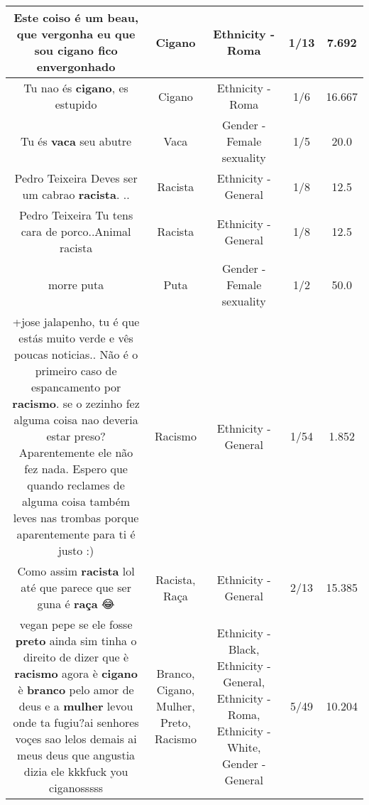 \documentclass[11pt]{article}
\newlength\mylength
\begin{document}
\begin{center}
\begin{longtable}{|C{.65\mylength}|C{.30\mylength}|C{.12\mylength}|C{.12\mylength}|C{.12\mylength}|}
  \small Este coiso é um beau, que vergonha eu que sou \textbf{cigano} fico envergonhado\normalsize   & Cigano & Ethnicity - Roma & 1/13 & 7.692 \\  \hline
  \small Tu nao és \textbf{cigano}, es estupido\normalsize   & Cigano & Ethnicity - Roma & 1/6 & 16.667 \\  \hline
  \small Tu és \textbf{vaca} seu abutre\normalsize   & Vaca & Gender - Female sexuality & 1/5 & 20.0 \\  \hline
  \small Pedro Teixeira Deves ser um cabrao \textbf{racista}. ..\normalsize   & Racista & Ethnicity - General & 1/8 & 12.5 \\  \hline
  \small Pedro Teixeira Tu tens cara de porco..Animal racista\normalsize   & Racista & Ethnicity - General & 1/8 & 12.5 \\  \hline
  \small morre puta\normalsize   & Puta & Gender - Female sexuality & 1/2 & 50.0 \\  \hline
  \small +jose jalapenho, tu é que estás muito verde e vês poucas noticias.. Não é o primeiro caso de espancamento por \textbf{racismo}. se o zezinho fez alguma coisa nao deveria estar preso? Aparentemente ele não fez nada. Espero que quando reclames de alguma coisa também leves nas trombas porque aparentemente para ti é justo :)\normalsize   & Racismo & Ethnicity - General & 1/54 & 1.852 \\  \hline
  \small Como assim \textbf{racista} lol até que parece que ser guna é \textbf{raça} 😂\normalsize   & Racista, Raça & Ethnicity - General & 2/13 & 15.385 \\  \hline
  \small vegan pepe se ele fosse \textbf{preto} ainda sim tinha o direito de dizer que è \textbf{racismo} agora è \textbf{cigano} è \textbf{branco} pelo amor de deus e a \textbf{mulher} levou onde ta fugiu?ai senhores voçes sao lelos demais ai meus deus que angustia dizia ele kkkfuck you ciganosssss\normalsize   & Branco, Cigano, Mulher, Preto, Racismo & Ethnicity - Black, Ethnicity - General, Ethnicity - Roma, Ethnicity - White, Gender - General & 5/49 & 10.204 \\  \hline

\end{longtable}
\end{center}
\end{document}
